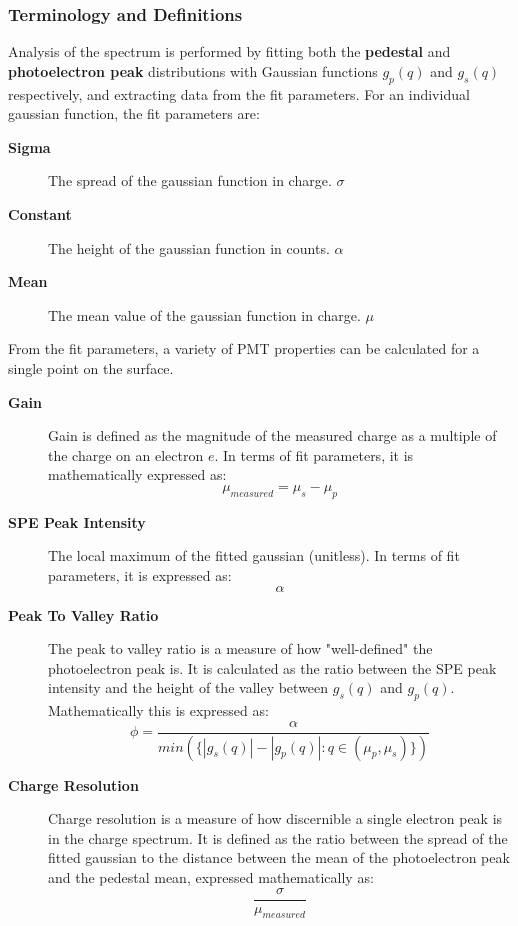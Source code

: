 \documentclass[twoside,letterpaper]{refart}
\begin{document}
\subsubsection{Terminology and Definitions}

Analysis of the spectrum is performed by fitting both the \textbf{pedestal} and \textbf{photoelectron peak} distributions with Gaussian functions $g_p(q)$ and $g_s(q)$ respectively, and extracting data from the fit parameters.  For an individual gaussian function, the fit parameters are:

\begin{description}
	
\item[\textbf{Sigma}] 

The spread of the gaussian function in charge. $\sigma$

\item[\textbf{Constant}] 

The height of the gaussian function in counts. $\alpha$

\item[\textbf{Mean}] The mean value of the gaussian function in charge. $\mu$

\end{description}

From the fit parameters, a variety of PMT properties can be calculated for a single point on the surface.

\begin{description}
	\item[\textbf{Gain}] Gain is defined as the magnitude of the measured charge as a multiple of the charge on an electron $e$.  In terms of fit parameters, it is mathematically expressed as: \[\mu_{measured} = \mu_s - \mu_p \] 
	\item[\textbf{SPE Peak Intensity}] The local maximum of the fitted gaussian (unitless).  In terms of fit parameters, it is expressed as: \[ \alpha\]
	\item[\textbf{Peak To Valley Ratio}] The peak to valley ratio is a measure of how "well-defined" the photoelectron peak is. It is calculated as the ratio between the SPE peak intensity and the height of the valley between $g_s(q)$ and $g_p(q)$. Mathematically this is expressed as: \[\phi = \frac{\alpha}{min(\{|g_s(q)| - |g_p(q)|: q \in (\mu_p, \mu_s)\})} \]
	\item[\textbf{Charge Resolution}] Charge resolution is a measure of how discernible a single electron peak is in the charge spectrum.  It is defined as the ratio between the spread of the fitted gaussian to the distance between the mean of the photoelectron peak and the pedestal mean, expressed mathematically as: \[\frac{\sigma}{\mu_{measured}}\]

\end{description}
\end{document}
